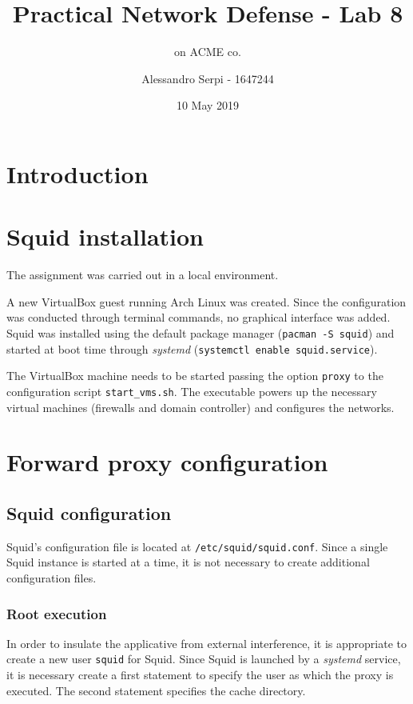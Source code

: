 \documentclass[draft]{homework}
\title{Practical Network Defense - Lab 8}
\subtitle{\sq on ACME co.}
\author{Alessandro Serpi - 1647244}
\date{10 May 2019}
\newcommand{\sq}{Squid\xspace}
\newcommand{\vb}{VirtualBox\xspace}
\begin{document}
    \maketitle
    \tableofcontents
    
    
    \pagebreak
    \section{Introduction}
    
    
    \section{\sq installation}
    The assignment was carried out in a local environment.
    
    A new \vb guest running Arch Linux was created.
    Since the configuration was conducted through terminal commands, no graphical interface was added.
    Squid was installed using the default package manager (\texttt{pacman -S squid}) and started at boot time through \textit{systemd} (\texttt{systemctl enable squid.service}).
    
    The \vb machine needs to be started passing the option \texttt{proxy} to the configuration script \texttt{start\_vms.sh}.
    The executable powers up the necessary virtual machines (firewalls and domain controller) and configures the networks.
    
    
    \section{Forward proxy configuration}
    \subsection{Squid configuration}
    \sq's configuration file is located at \texttt{/etc/squid/squid.conf}.
    Since a single \sq instance is started at a time, it is not necessary to create additional configuration files.
    
    \subsubsection{Root execution}
    In order to insulate the applicative from external interference, it is appropriate to create a new user \texttt{squid} for \sq.
    Since \sq is launched by a \textit{systemd} service, it is necessary create a first statement to specify the user as which the proxy is executed.
    The second statement specifies the cache directory.
    
\end{document}
